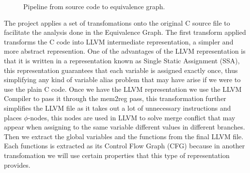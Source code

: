 \documentclass{article}
\begin{document}
\begin{figure}[h]
    \centering
    \caption{Pipeline from source code to equivalence graph.}
\end{figure}

The project applies a set of transfomations onto the original C source file to facilitate the analysis done in the Equivalence Graph.
The first transform applied transforms the C code into LLVM intermediate representation, a simpler and more abstract represention.
One of the advantages of the LLVM representation is that it is written in a representation known as Single Static Assignment (SSA),
this representation guarantees that each variable is assigned exactly once, thus simplifying any kind of variable alias problem that may have arise if we were to use
the plain C code.
Once we have the LLVM representation we use the LLVM Compiler to pass it through the mem2reg pass, this transformation further simplifies the LLVM file
as it takes out a lot of unnecessary instructions and places $\phi$-nodes, this nodes are used in LLVM to solve merge conflict that may appear when assigning
to the same variable different values in different branches.
Then we extract the global variables and the functions from the final LLVM file. Each functions is extracted as its Control Flow Graph (CFG)
because in another transfomation we will use certain properties that this type of representation provides.
\end{document}
